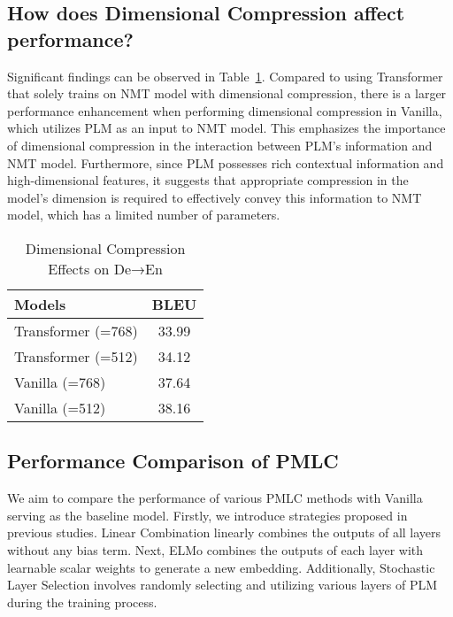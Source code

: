 \documentclass[conference]{IEEEtran}
\begin{document}
\subsection{How does Dimensional Compression affect performance?}
Significant findings can be observed in Table~\ref{tab:1}. Compared to using Transformer that solely trains on NMT model with dimensional compression, there is a larger performance enhancement when performing dimensional compression in Vanilla, which utilizes PLM as an input to NMT model. This emphasizes the importance of dimensional compression in the interaction between PLM's information and NMT model. Furthermore, since PLM possesses rich contextual information and high-dimensional features, it suggests that appropriate compression in the model's dimension is required to effectively convey this information to NMT model, which has a limited number of parameters.

\begin{table}[!tb]
    \centering
    \caption{Dimensional Compression Effects on De→En}
    \label{tab:1}
    \begin{tabular}{|l|c|}
        \hline
        \textbf{Models} & \textbf{BLEU} \\
        \hline
        Transformer (=768) & 33.99 \\
        Transformer (=512) & 34.12 \\
        Vanilla (=768) & 37.64 \\
        Vanilla (=512) & 38.16 \\
        \hline
    \end{tabular}
\end{table}



\subsection{Performance Comparison of PMLC}
We aim to compare the performance of various PMLC methods with Vanilla serving as the baseline model. Firstly, we introduce strategies proposed in previous studies. Linear Combination \cite{dou2018exploiting} linearly combines the outputs of all layers without any bias term. Next, ELMo \cite{edunov2019pretrained} combines the outputs of each layer with learnable scalar weights to generate a new embedding. Additionally, Stochastic Layer Selection \cite{xu2021bibert} involves randomly selecting and utilizing various layers of PLM during the training process.
\end{document}

